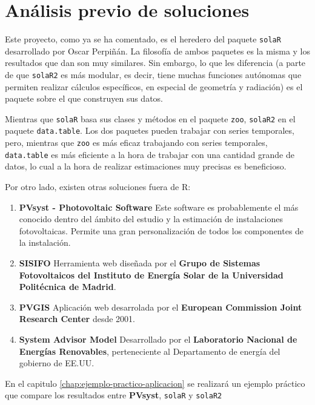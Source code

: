 \section{Análisis previo de soluciones}
\label{sec:orgcef32ac}
Este proyecto, como ya se ha comentado, es el heredero del paquete \texttt{solaR} desarrollado por Oscar Perpiñán. La filosofía de ambos paquetes es la misma y los resultados que dan son muy similares. Sin embargo, lo que les diferencia (a parte de que \texttt{solaR2} es más modular, es decir, tiene muchas funciones autónomas que permiten realizar cálculos específicos, en especial de geometría y radiación) es el paquete sobre el que construyen sus datos.

Mientras que \texttt{solaR} basa sus clases y métodos en el paquete \texttt{zoo}, \texttt{solaR2} en el paquete \texttt{data.table}. Los dos paquetes pueden trabajar con series temporales, pero, mientras que \texttt{zoo} es más eficaz trabajando con series temporales, \texttt{data.table} es más eficiente a la hora de trabajar con una cantidad grande de datos, lo cual a la hora de realizar estimaciones muy precisas es beneficioso.

Por otro lado, existen otras soluciones fuera de R:
\begin{enumerate}
\item \textbf{PVsyst - Photovoltaic Software} \cite{pvsyst}
Este software es probablemente el más conocido dentro del ámbito del estudio y la estimación de instalaciones fotovoltaicas. Permite una gran personalización de todos los componentes de la instalación.
\item \textbf{SISIFO} \cite{sisifo}
Herramienta web diseñada por el \textbf{Grupo de Sistemas Fotovoltaicos del Instituto de Energía Solar de la Universidad Politécnica de Madrid}.
\item \textbf{PVGIS} \cite{pvgis}
Aplicación web desarrolada por el \textbf{European Commission Joint Research Center} desde 2001.
\item \textbf{System Advisor Model} \cite{sam}
Desarrollado por el \textbf{Laboratorio Nacional de Energías Renovables}, perteneciente al Departamento de energía del gobierno de EE.UU.
\end{enumerate}
En el capitulo \ref{chap:ejemplo-practico-aplicacion} se realizará un ejemplo práctico que compare los resultados entre \textbf{PVsyst}, \texttt{solaR} y \texttt{solaR2}
